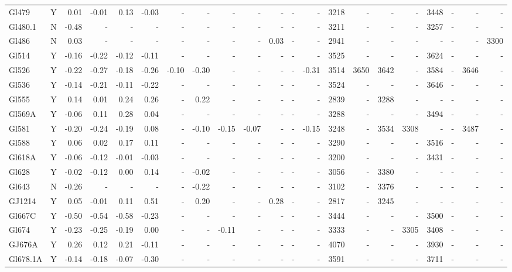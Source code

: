 \documentclass{aa}
\begin{document}
{\begin{landscape}
{\begin{longtable}{l c r r r r r r r r r r r | r r r r r r r r }
Gl479 & Y & 0.01 & -0.01 & 0.13 & -0.03 & - & - & - & - & - & - & - & 3218 & - & - & - & 3448 & - & - & - \\
Gl480.1 & N & -0.48 & - & - & - & - & - & - & - & - & - & - & 3211 & - & - & - & 3257 & - & - & - \\
Gl486 & N & 0.03 & - & - & - & - & - & - & - & 0.03 & - & - & 2941 & - & - & - & - & - & - & 3300 \\
Gl514 & Y & -0.16 & -0.22 & -0.12 & -0.11 & - & - & - & - & - & - & - & 3525 & - & - & - & 3624 & - & - & - \\
Gl526 & Y & -0.22 & -0.27 & -0.18 & -0.26 & -0.10 & -0.30 & - & - & - & - & -0.31 & 3514 & 3650 & 3642 & - & 3584 & - & 3646 & - \\
Gl536 & Y & -0.14 & -0.21 & -0.11 & -0.22 & - & - & - & - & - & - & - & 3524 & - & - & - & 3646 & - & - & - \\
Gl555 & Y & 0.14 & 0.01 & 0.24 & 0.26 & - & 0.22 & - & - & - & - & - & 2839 & - & 3288 & - & - & - & - & - \\
Gl569A & Y & -0.06 & 0.11 & 0.28 & 0.04 & - & - & - & - & - & - & - & 3288 & - & - & - & 3494 & - & - & - \\
Gl581 & Y & -0.20 & -0.24 & -0.19 & 0.08 & - & -0.10 & -0.15 & -0.07 & - & - & -0.15 & 3248 & - & 3534 & 3308 & - & - & 3487 & - \\
Gl588 & Y & 0.06 & 0.02 & 0.17 & 0.11 & - & - & - & - & - & - & - & 3290 & - & - & - & 3516 & - & - & - \\
Gl618A & Y & -0.06 & -0.12 & -0.01 & -0.03 & - & - & - & - & - & - & - & 3200 & - & - & - & 3431 & - & - & - \\
Gl628 & Y & -0.02 & -0.12 & 0.00 & 0.14 & - & -0.02 & - & - & - & - & - & 3056 & - & 3380 & - & - & - & - & - \\
Gl643 & N & -0.26 & - & - & - & - & -0.22 & - & - & - & - & - & 3102 & - & 3376 & - & - & - & - & - \\
GJ1214 & Y & 0.05 & -0.01 & 0.11 & 0.51 & - & 0.20 & - & - & 0.28 & - & - & 2817 & - & 3245 & - & - & - & - & - \\
Gl667C & Y & -0.50 & -0.54 & -0.58 & -0.23 & - & - & - & - & - & - & - & 3444 & - & - & - & 3500 & - & - & - \\
Gl674 & Y & -0.23 & -0.25 & -0.19 & 0.00 & - & - & -0.11 & - & - & - & - & 3333 & - & - & 3305 & 3408 & - & - & - \\
GJ676A & Y & 0.26 & 0.12 & 0.21 & -0.11 & - & - & - & - & - & - & - & 4070 & - & - & - & 3930 & - & - & - \\
Gl678.1A & Y & -0.14 & -0.18 & -0.07 & -0.30 & - & - & - & - & - & - & - & 3591 & - & - & - & 3711 & - & - & - \\

\end{longtable}}
\end{landscape}}
\end{document}
